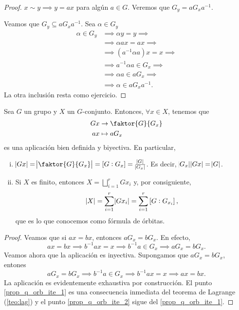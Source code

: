 \begin{proof}
    $x \sim y \implies y = ax$ para algún $a \in G$. Veremos que $G_y = aG_xa^{-1}$.

    Veamos que $G_y \subseteq aG_xa^{-1}$. Sea $\alpha \in G_y$
    \[
        \begin{aligned}
            \alpha \in G_y &\implies \alpha y = y \implies \\
            &\implies \alpha ax = ax \implies \\
            &\implies \left( a^{-1} \alpha a \right)x = x \implies \\
            &\implies a^{-1} \alpha a \in G_x \implies \\
            &\implies \alpha a \in a G_x \implies \\
            &\implies \alpha \in a G_x a^{-1}.
        \end{aligned}
    \]
    La otra inclusión resta como ejercicio.
\end{proof}

\begin{prop} \label{prop:forb}
    Sea $G$ un grupo y $X$ un $G$-conjunto. Entonces, $\forall x \in X$, tenemos que
    \[
        \begin{aligned}
            G x &\to \faktor{G}{G_x} \\
            ax &\mapsto a G_x
        \end{aligned}
    \]
    es una aplicación bien definida y biyectiva.
    En particular,
    \begin{enumerate}[i)]
        \item \label{prop_q_orb_ite_1} $\abs{Gx} =  \abs{\faktor{G}{G_x}} = \left[ G : G_x \right] = \frac{\abs{G}}{\abs{G_x}}$. Es decir,
            $\label{Gx}\abs{G_x}\abs{Gx} = \abs{G}$.
        \item \label{prop_q_orb_ite_2} Si $X$ es finito, entonces $X = \bigsqcup\limits^r_{i = 1} G x_i$ y, por consiguiente,
            \[
                \abs{X} = \sum^r_{i = 1} \abs{G x_i} = \sum^r_{i = 1} \left[ G : G_{x_i} \right],
            \]
            que es lo que conocemos como fórmula de órbitas.
    \end{enumerate}
\end{prop}

\begin{proof}
    Veamos que si $ax = bx$, entonces $a G_x = b G_x$. En efecto,
    \[
        ax = bx \implies b^{-1}ax = x \implies b^{-1}a \in G_x \implies aG_x = bG_x.
    \]
    Veamos ahora que la aplicación es inyectiva. Supongamos que $aG_x = bG_x$, entones
    \[
        a G_x = b G_x \implies b^{-1}a \in G_x \implies b^{-1}a x = x \implies ax = bx.
    \]
    La aplicación es evidentemente exhaustiva por construcción.
    El punto \ref{prop_q_orb_ite_1} es una consecuencia inmediata del teorema de Lagrange (\ref{teo:lag}) y el punto \ref{prop_q_orb_ite_2} sigue del \ref{prop_q_orb_ite_1}.
    
\end{proof}


